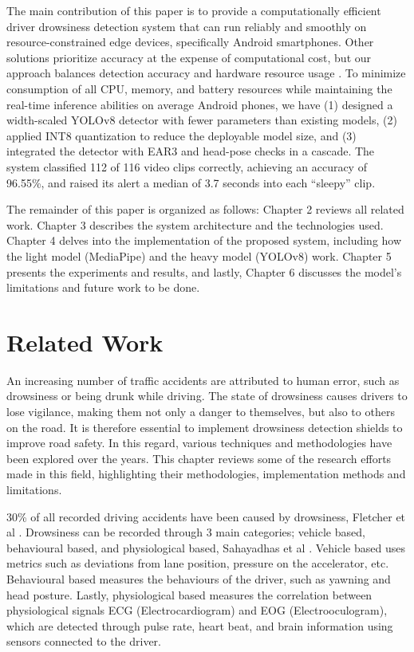 \documentclass[pdflatex,sn-mathphys-num]{sn-jnl}
\theoremstyle{thmstyleone}%
\theoremstyle{thmstyletwo}%
\theoremstyle{thmstylethree}%
\begin{document}
	The main contribution of this paper is to provide a computationally efficient driver drowsiness detection system that can run reliably and smoothly on resource-constrained edge devices, specifically Android smartphones. Other solutions prioritize accuracy at the expense of computational cost, but our approach balances detection accuracy and hardware resource usage \cite{bib10, bib11}. To minimize consumption of all CPU, memory, and battery resources while maintaining the real-time inference abilities on average Android phones, we have (1) designed a width-scaled YOLOv8 detector with fewer parameters than existing models, (2) applied INT8 quantization to reduce the deployable model size, and (3) integrated the detector with EAR3 and head-pose checks in a cascade. The system classified 112 of 116 video clips correctly, achieving an accuracy of 96.55\%, and raised its alert a median of 3.7 seconds into each “sleepy” clip.
	
	The remainder of this paper is organized as follows: Chapter 2 reviews all related work. Chapter 3 describes the system architecture and the technologies used. Chapter 4 delves into the implementation of the proposed system, including how the light model (MediaPipe) and the heavy model (YOLOv8) work. Chapter 5 presents the experiments and results, and lastly, Chapter 6 discusses the model’s limitations and future work to be done.
	
	\section{Related Work}\label{sec:related}
	
	An increasing number of traffic accidents are attributed to human error, such as drowsiness or being drunk while driving. The state of drowsiness causes drivers to lose vigilance, making them not only a danger to themselves, but also to others on the road. It is therefore essential to implement drowsiness detection shields to improve road safety. In this regard, various techniques and methodologies have been explored over the years. This chapter reviews some of the research efforts made in this field, highlighting their methodologies, implementation methods and limitations. 
	
	30\% of all recorded driving accidents have been caused by drowsiness, Fletcher et al \cite{bib12}. Drowsiness can be recorded through 3 main categories; vehicle based, behavioural based, and physiological based, Sahayadhas et al  \cite{bib13}. Vehicle based uses metrics such as deviations from lane position, pressure on the accelerator, etc. Behavioural based measures the behaviours of the driver, such as yawning and head posture. Lastly, physiological based measures the correlation between physiological signals ECG (Electrocardiogram) and EOG (Electrooculogram), which are detected through pulse rate, heart beat, and brain information using sensors connected to the driver.
	
\end{document}
